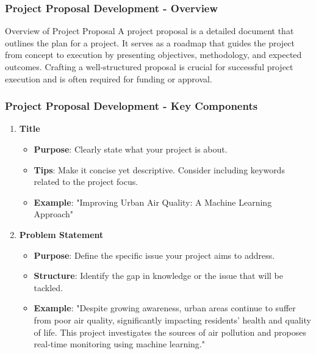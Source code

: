 \documentclass[aspectratio=169]{beamer}
\begin{document}
\begin{frame}[fragile]
    \frametitle{Project Proposal Development - Overview}
    \begin{block}{Overview of Project Proposal}
        A project proposal is a detailed document that outlines the plan for a project. It serves as a roadmap that guides the project from concept to execution by presenting objectives, methodology, and expected outcomes. Crafting a well-structured proposal is crucial for successful project execution and is often required for funding or approval.
    \end{block}
\end{frame}

\begin{frame}[fragile]
    \frametitle{Project Proposal Development - Key Components}
    \begin{enumerate}
        \item \textbf{Title}
            \begin{itemize}
                \item \textbf{Purpose}: Clearly state what your project is about.
                \item \textbf{Tips}: Make it concise yet descriptive. Consider including keywords related to the project focus.
                \item \textbf{Example}: "Improving Urban Air Quality: A Machine Learning Approach"
            \end{itemize}
            
        \item \textbf{Problem Statement}
            \begin{itemize}
                \item \textbf{Purpose}: Define the specific issue your project aims to address.
                \item \textbf{Structure}: Identify the gap in knowledge or the issue that will be tackled.
                \item \textbf{Example}: "Despite growing awareness, urban areas continue to suffer from poor air quality, significantly impacting residents' health and quality of life. This project investigates the sources of air pollution and proposes real-time monitoring using machine learning."
            \end{itemize}


\end{enumerate}
\end{frame}
\end{document}
